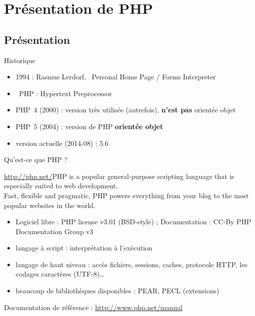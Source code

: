 
\section{Présentation de PHP}

\subsection{Présentation}

\begin{frame}{Historique}
    \begin{itemize}
	    \item 1994 : Rasmus Lerdorf, \og~Personal Home Page / Forms Interpreter~\fg
    	\item \og~PHP : Hypertext Preprocessor~\fg 
    	\item PHP~4 (2000) : version très utilisée (autrefois), \textbf{n’est pas} orientée objet
    	\item PHP~5 (2004) : version de PHP \textbf{orientée objet}
    	\item version actuelle (2014-08) : 5.6
    \end{itemize}
\end{frame}

\begin{frame}{Qu'est-ce que PHP ?}
    \begin{block}{\url{http://php.net/}}PHP is a popular general-purpose scripting language that is especially suited to web development.\\Fast, flexible and pragmatic, PHP powers everything from your blog to the most popular websites in the world.
    \end{block}
    \begin{itemize}
        \item Logiciel libre : PHP license v3.01 (BSD-style) ; Documentation : CC-By PHP Documentation Group v3
        \item langage à script : interprétation à l’exécution
        \item langage de haut niveau : accès fichiers, sessions, caches, protocole HTTP, les codages caractères (UTF-8)\ldots
        \item beaucoup de bibliothèques disponibles : PEAR, PECL (extensions)
    \end{itemize}
    Documentation de référence : \url{http://www.php.net/manual}
\end{frame}

